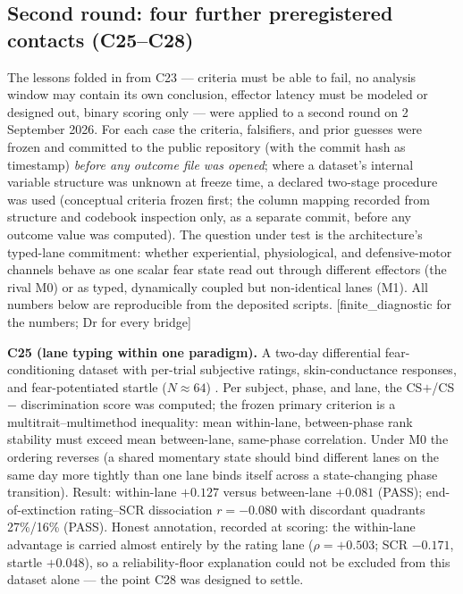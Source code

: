 \documentclass[9pt,twocolumn]{article}
\newcommand{\tier}[1]{{\sffamily\scriptsize\color{RRHMSlate}[#1]}}
\begin{document}
\subsection{Second round: four further preregistered contacts (C25--C28)}
\label{sec:secondcontact}
The lessons folded in from C23 --- criteria must be able to fail, no analysis window may contain its own conclusion, effector latency must be modeled or designed out, binary scoring only --- were applied to a second round on 2 September 2026. For each case the criteria, falsifiers, and prior guesses were frozen and committed to the public repository (with the commit hash as timestamp) \emph{before any outcome file was opened}; where a dataset's internal variable structure was unknown at freeze time, a declared two-stage procedure was used (conceptual criteria frozen first; the column mapping recorded from structure and codebook inspection only, as a separate commit, before any outcome value was computed). The question under test is the architecture's typed-lane commitment: whether experiential, physiological, and defensive-motor channels behave as one scalar fear state read out through different effectors (the rival M0) or as typed, dynamically coupled but non-identical lanes (M1). All numbers below are reproducible from the deposited scripts. \tier{finite\_diagnostic for the numbers; Dr for every bridge}

\textbf{C25 (lane typing within one paradigm).} A two-day differential fear-conditioning dataset with per-trial subjective ratings, skin-conductance responses, and fear-potentiated startle ($N{\approx}64$) \cite{iuhamburg2021}. Per subject, phase, and lane, the CS$+$/CS$-$ discrimination score was computed; the frozen primary criterion is a multitrait--multimethod inequality: mean within-lane, between-phase rank stability must exceed mean between-lane, same-phase correlation. Under M0 the ordering reverses (a shared momentary state should bind different lanes on the same day more tightly than one lane binds itself across a state-changing phase transition). Result: within-lane $+0.127$ versus between-lane $+0.081$ (PASS); end-of-extinction rating--SCR dissociation $r=-0.080$ with discordant quadrants 27\%/16\% (PASS). Honest annotation, recorded at scoring: the within-lane advantage is carried almost entirely by the rating lane ($\rho=+0.503$; SCR $-0.171$, startle $+0.048$), so a reliability-floor explanation could not be excluded from this dataset alone --- the point C28 was designed to settle.
\end{document}
